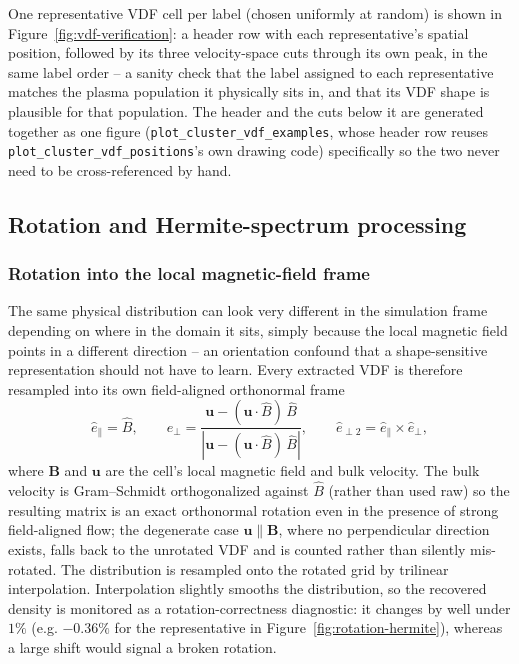 \documentclass[11pt]{article}
\begin{document}
One representative VDF cell per label (chosen uniformly at random) is
shown in Figure~\ref{fig:vdf-verification}: a header row with each
representative's spatial position, followed by its three velocity-space
cuts through its own peak, in the same label order -- a sanity check
that the label assigned to each representative matches the plasma
population it physically sits in, and that its VDF shape is plausible
for that population. The header and the cuts below it are generated
together as one figure (\texttt{plot\_cluster\_vdf\_examples}, whose
header row reuses \texttt{plot\_cluster\_vdf\_positions}'s own drawing
code) specifically so the two never need to be cross-referenced by hand.

\subsection{Rotation and Hermite-spectrum processing}
\label{sec:rotation-hermite}

\subsubsection{Rotation into the local magnetic-field frame}
The same physical distribution can look very different in the simulation
frame depending on where in the domain it sits, simply because the local
magnetic field points in a different direction -- an orientation
confound that a shape-sensitive representation should not have to learn.
Every extracted VDF is therefore resampled into its own field-aligned
orthonormal frame
\begin{equation}
\hat{e}_\parallel = \hat{B}, \qquad
\hat{e}_{\perp} = \frac{\mathbf{u} - (\mathbf{u}\cdot\hat{B})\,\hat{B}}
                        {\left|\mathbf{u} - (\mathbf{u}\cdot\hat{B})\,\hat{B}\right|}, \qquad
\hat{e}_{\perp 2} = \hat{e}_\parallel \times \hat{e}_{\perp},
\label{eq:rotation-frame}
\end{equation}
where $\mathbf{B}$ and $\mathbf{u}$ are the cell's local magnetic field
and bulk velocity. The bulk velocity is Gram--Schmidt orthogonalized
against $\hat{B}$ (rather than used raw) so the resulting matrix is an
exact orthonormal rotation even in the presence of strong field-aligned
flow; the degenerate case $\mathbf{u} \parallel \mathbf{B}$, where no
perpendicular direction exists, falls back to the unrotated VDF and is
counted rather than silently mis-rotated. The distribution is resampled
onto the rotated grid by trilinear interpolation. Interpolation slightly
smooths the distribution, so the recovered density is monitored as a
rotation-correctness diagnostic: it changes by well under $1\%$ (e.g.
$-0.36\%$ for the representative in Figure~\ref{fig:rotation-hermite}),
whereas a large shift would signal a broken rotation.
\end{document}
